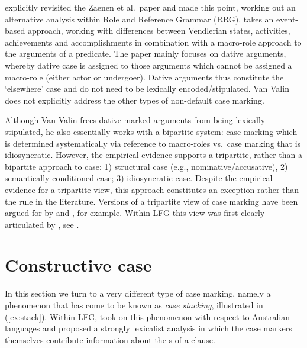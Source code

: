 \documentclass[output=paper,hidelinks]{langscibook}
\begin{document}
\citet{vanvalin91} explicitly revisited the Zaenen et
al.~paper and made this point, working out an alternative analysis
within Role and Reference Grammar (RRG).
\citet{vanvalin91}   takes an event-based approach, working with
differences between Vendlerian states, activities, achievements and accomplishments in
combination with a macro-role approach to the arguments of a predicate. The
paper mainly focuses on dative arguments, whereby dative case is assigned to
those arguments which cannot be assigned a macro-role (either actor or
undergoer).  Dative arguments thus constitute the `elsewhere' case  and do not
need to be lexically encoded/stipulated.  Van Valin
does not explicitly address the other types of non-default case marking. 

Although Van Valin frees dative marked arguments from being lexically
stipulated, he also essentially works with a bipartite system:  case marking
which is determined systematically via reference to macro-roles vs.~case marking
that is idiosyncratic.  However, the empirical evidence supports a tripartite,
rather than a bipartite approach to case:  1) structural case (e.g.,
nominative/accusative), 2) semantically conditioned case; 3) idiosyncratic
case. Despite the empirical evidence for a tripartite view, this approach
constitutes an exception rather than the rule in the literature.  Versions of a tripartite view of
case marking have been argued for by \citet{donohue2004} and \citet{wool:06}, for
example. Within LFG this view was
first clearly articulated by \citet{buttking05}, see . 

\section{Constructive case}
\label{sec:constr}

In this section we turn to a very different type of case marking, namely a
phenomenon that has come to be known as  {\em case stacking}, illustrated in  (\ref{ex:stack}). Within LFG, 
\citet{nordlinger1998constructive,nordlinger2000} took on this phenomenon
with respect to 
Australian languages and proposed a strongly lexicalist analysis in which the
case markers themselves contribute information about the {\GF}s of a clause.
\end{document}
